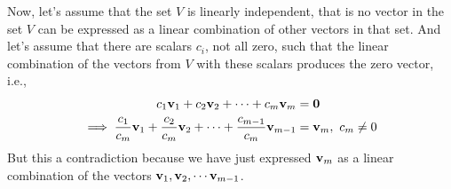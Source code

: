 Now, let's assume that the set $V$ is linearly independent, that is no vector in the set $V$ can be expressed as a linear combination of other vectors in that set. And let's assume that there are scalars $c_i$, not all zero, such that the linear combination of the vectors from $V$ with these scalars produces the zero vector, i.e.,
\[ \begin{split}
    c_1 \mathbf{v}_1 + c_2 \mathbf{v}_2 + \cdots + c_m \mathbf{v}_m &= \mathbf{0} \\
    \implies \frac{c_1}{c_m} \mathbf{v}_1 + \frac{c_2}{c_m} \mathbf{v}_2 + \cdots + \frac{c_{m-1}}{c_m}\mathbf{v}_{m-1} &= \mathbf{v}_m, \,\, c_m \neq 0
\end{split} \]
But this a contradiction because we have just expressed $\mathbf{v}_m$ as a linear combination of the vectors $\mathbf{v}_1, \mathbf{v}_2, \cdots \mathbf{v}_{m-1}$.

